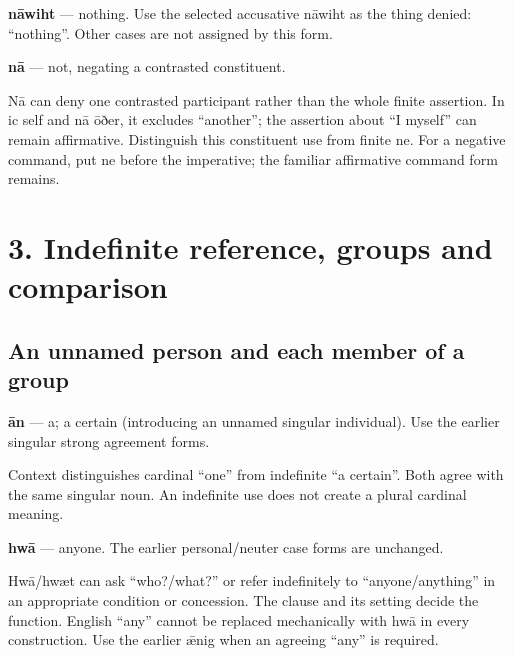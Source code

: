 \textbf{nāwiht} — nothing. Use the selected accusative nāwiht as the thing denied: “nothing”. Other cases are not assigned by this form.

\textbf{nā} — not, negating a contrasted constituent.

Nā can deny one contrasted participant rather than the whole finite assertion. In ic self and nā ōðer, it excludes “another”; the assertion about “I myself” can remain affirmative. Distinguish this constituent use from finite ne. For a negative command, put ne before the imperative; the familiar affirmative command form remains.

\section*{3. Indefinite reference, groups and comparison}

\subsection*{An unnamed person and each member of a group}

\textbf{ān} — a; a certain (introducing an unnamed singular individual). Use the earlier singular strong agreement forms.

Context distinguishes cardinal “one” from indefinite “a certain”. Both agree with the same singular noun. An indefinite use does not create a plural cardinal meaning.

\textbf{hwā} — anyone. The earlier personal/\allowbreak{}neuter case forms are unchanged.

Hwā/\allowbreak{}hwæt can ask “who?/\allowbreak{}what?” or refer indefinitely to “anyone/\allowbreak{}anything” in an appropriate condition or concession. The clause and its setting decide the function. English “any” cannot be replaced mechanically with hwā in every construction. Use the earlier ǣnig when an agreeing “any” is required.

